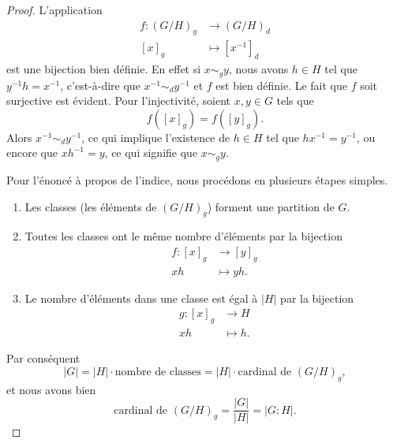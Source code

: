 \begin{proof}
    L'application
    \begin{equation}
        \begin{aligned}
            f\colon (G/H)_g&\to (G/H)_d \\
            [x]_g&\mapsto [x^{-1}]_d
        \end{aligned}
    \end{equation}
    est une bijection bien définie. En effet si \( x\sim_g y\), nous avons \( h\in H\) tel que \( y^{-1}h=x^{-1}\), c'est-à-dire que \( x^{-1}\sim_d y^{-1}\) et \( f\) est bien définie. Le fait que \( f\) soit surjective est évident. Pour l'injectivité, soient \( x, y \in G \) tels que
    \begin{equation}
        f([x]_g)=f([y]_g).
    \end{equation}
    Alors \( x^{-1}\sim_d y^{-1}\), ce qui implique l'existence de \( h\in H\) tel que \( hx^{-1}=y^{-1}\), ou encore que \( xh^{-1}=y\), ce qui signifie que \( x\sim_gy\).

    Pour l'énoncé à propos de l'indice, nous procédons en plusieurs étapes simples.
    \begin{enumerate}
        \item
            Les classes (les éléments de \( (G/H)_g\)) forment une partition de $G$.
        \item
            Toutes les classes ont le même nombre d'éléments par la bijection
            \begin{equation}
                \begin{aligned}
                    f\colon [x]_g&\to [y]_g \\
                    xh&\mapsto yh.
                \end{aligned}
            \end{equation}
        \item
            Le nombre d'éléments dans une classe est égal à \( | H |\) par la bijection
            \begin{equation}
                \begin{aligned}
                    g\colon [x]_g&\to H \\
                    xh&\mapsto h.
                \end{aligned}
            \end{equation}
    \end{enumerate}
    Par conséquent
    \begin{equation}
        | G |=| H |\cdot \text{nombre de classes}=| H |\cdot\text{cardinal de $(G/H)_g$},
    \end{equation}
    et nous avons bien
    \begin{equation}
        \text{cardinal de }(G/H)_g=\frac{ | G | }{ | H | }=| G:H |.
    \end{equation}
\end{proof}

